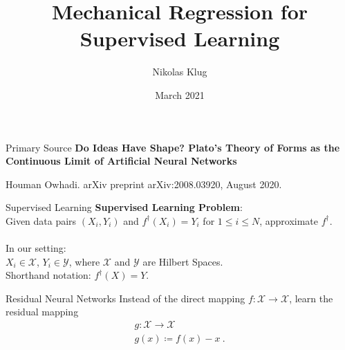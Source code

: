 \documentclass[8pt]{beamer}
\title[]{Mechanical Regression for Supervised Learning}
\author[Nikolas Klug]{Nikolas Klug}
\institute[University of Augsburg]{University of Augsburg}
\date{\nth{25} March 2021}
\newcommand{\cX}{\mathcal{X}}
\newcommand{\cY}{\mathcal{Y}}
\begin{document}
	{
	\begin{frame}
		\titlepage
	\end{frame}
	}
	\addtocounter{framenumber}{-1}

	\begin{frame}{Primary Source}
		\textbf{Do Ideas Have Shape? Plato's Theory of Forms as the Continuous Limit of Artificial Neural Networks}\linebreak
		\begin{footnotesize}
			Houman Owhadi.\linebreak
			arXiv preprint arXiv:2008.03920, August 2020.
		\end{footnotesize}
	\end{frame}

	\begin{frame}{Supervised Learning}
		\textbf{Supervised Learning Problem}:\\
		Given data pairs $(X_i, Y_i)$ and $f^\dagger(X_i) = Y_i$ for $1 \leq i \leq N$,
		approximate $f^\dagger$.
		\\~\\
		In our setting:\\
		$X_i \in \cX$, $Y_i \in \cY$, where $\cX$ and $\cY$ are Hilbert Spaces.\\
		Shorthand notation: $f^\dagger(X) = Y$.
	\end{frame}

	\begin{frame}{Residual Neural Networks}
		Instead of the direct mapping $f: \cX \rightarrow \cX$, learn the residual mapping 
		\begin{gather*}
			g: \cX \rightarrow \cX\\
			g(x) \coloneqq f(x) - x \ .
		\end{gather*}
		
	\end{frame}
\end{document}
